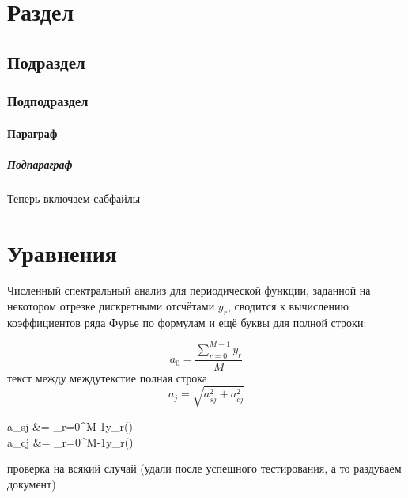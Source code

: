 \documentclass[a4paper]{article}
\begin{document}
	\tableofcontents
	\section{Раздел}
	\blindtext
	\subsection{Подраздел}
	\blindtext
	\subsubsection{Подподраздел}
	\blindtext
	\paragraph{Параграф}
	\blindtext
	\subparagraph{Подпараграф}
	\blindtext
	
	\newpage
	
	\vfill
	
	Теперь включаем сабфайлы
	
	\vfill
	
	\newpage
	
	

	
	\tableofcontents
	
	\section{Уравнения}
	Численный спектральный анализ для периодической функции, заданной на некотором отрезке дискретными отсчётами $y_r$, сводится к вычислению коэффициентов ряда Фурье по формулам и ещё буквы для полной строки:
	
	\begin{equation}\label{eq:a0}
		a_0=\frac{\sum\limits_{r=0}^{M-1}y_r}{M}
	\end{equation}
	текст между междутекстие полная строка
	\begin{equation}
		a_j=\sqrt{a_{sj}^2+a_{cj}^2}
	\end{equation}
\blindtext
	
	\begin{aleq}\label{eq:ascj}
		a_{sj} &= \sum\limits_{r=0}^{M-1}y_r\sin\left(\right)\\
		a_{cj} &= \sum\limits_{r=0}^{M-1}y_r\cos\left(\right)
	\end{aleq}
проверка на всякий случай (удали после успешного тестирования, а то раздуваем документ)
	\nocite{*}
\end{document}
